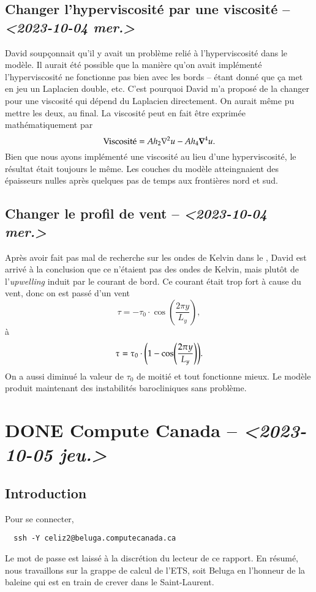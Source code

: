 \documentclass[10pt]{article}
\numberwithin{equation}{section}
\begin{document}
\subsection{Changer l'hyperviscosité par une viscosité -- \textit{<2023-10-04 mer.>}}
\label{sec:orgb844863}
David soupçonnait qu'il y avait un problème relié à l'hyperviscosité dans le modèle.
Il aurait été possible que la manière qu'on avait implémenté l'hyperviscosité ne fonctionne pas bien avec les bords -- étant donné que ça met en jeu un Laplacien double, etc. 
C'est pourquoi David m'a proposé de la changer pour une viscosité qui dépend du Laplacien directement.
On aurait même pu mettre les deux, au final.
La viscosité peut en fait être exprimée mathématiquement par
\begin{equation}
   \text{Viscosité} = Ah_2 \laplacian{u}  - Ah_4 \gradient^4 u.
\end{equation}
Bien que nous ayons implémenté une viscosité au lieu d'une hyperviscosité, le résultat était toujours le même.
Les couches du modèle atteingnaient des épaisseurs nulles après quelques pas de temps aux frontières nord et sud.

\subsection{Changer le profil de vent -- \textit{<2023-10-04 mer.>}}
\label{sec:orge87f874}
Après avoir fait pas mal de recherche sur les ondes de Kelvin dans le \citep{vallis_2006}, David est arrivé à la conclusion que ce n'étaient pas des ondes de Kelvin, mais plutôt de l'\emph{upwelling} induit par le courant de bord.
Ce courant était trop fort à cause du vent, donc on est passé d'un vent
\begin{equation}
   \tau = -\tau_0 \cdot \cos(\frac{2\pi y}{L_y}),
\end{equation}
à 
\begin{equation}
   \tau = \tau_0\cdot\qty(1-\cos(\frac{2\pi y}{L_y})).
\end{equation}
On a aussi diminué la valeur de \(\tau_0\) de moitié et tout fonctionne mieux.
Le modèle produit maintenant des instabilités barocliniques sans problème.

\section{{\bfseries\sffamily DONE} Compute Canada -- \textit{<2023-10-05 jeu.>}}
\label{sec:orgc701023}
\subsection{Introduction}
\label{sec:orgff5d125}
Pour se connecter,
\begin{verbatim}
  ssh -Y celiz2@beluga.computecanada.ca
\end{verbatim}
Le mot de passe est laissé à la discrétion du lecteur de ce rapport.
En résumé, nous travaillons sur la grappe de calcul de l'ETS, soit Beluga en l'honneur de la baleine qui est en train de crever dans le Saint-Laurent.
\end{document}
